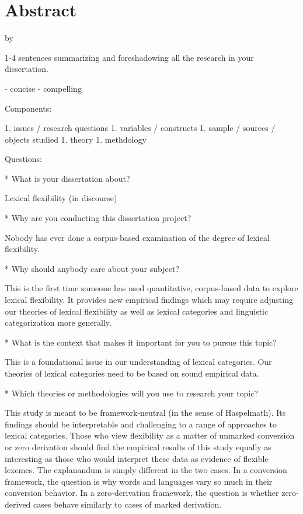 \section*{Abstract}
\label{sec:abstract}

\begin{center}

  \doctitle

  by

  \theauthor

\end{center}

1-4 sentences summarizing and foreshadowing all the research in your dissertation.

- concise
- compelling

Components:

1. issues / research questions
1. variables / constructs
1. sample / sources / objects studied
1. theory
1. methdology

Questions:

* What is your dissertation about?

  Lexical flexibility (in discourse)

* Why are you conducting this dissertation project?

  Nobody has ever done a corpus-based examination of the degree of lexical flexibility.

* Why should anybody care about your subject?

  This is the first time someone has used quantitative, corpus-based data to explore lexical flexibility. It provides new empirical findings which may require adjusting our theories of lexical flexibility as well as lexical categories and linguistic categorization more generally.

* What is the context that makes it important for you to pursue this topic?

  This is a foundational issue in our understanding of lexical categories. Our theories of lexical categories need to be based on sound empirical data.

* Which theories or methodologies will you use to research your topic?

  This study is meant to be framework-neutral (in the sense of Haspelmath). Its findings should be interpretable and challenging to a range of approaches to lexical categories. Those who view flexibility as a matter of unmarked conversion or zero derivation should find the empirical results of this study equally as interesting as those who would interpret these data as evidence of flexible lexemes. The explanandum is simply different in the two cases. In a conversion framework, the question is why words and languages vary so much in their conversion behavior. In a zero-derivation framework, the question is whether zero-derived cases behave similarly to cases of marked derivation.

